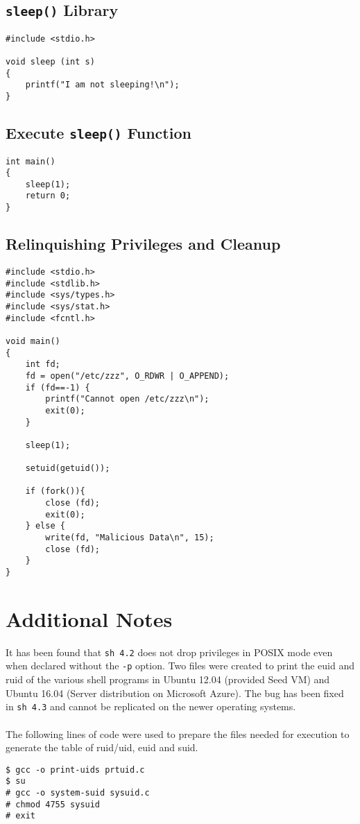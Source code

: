 \documentclass[a4paper,12pt]{article}
\begin{document}
\subsection{\texttt{sleep()} Library}
\label{Appsec:3.7}
\begin{verbatim}
#include <stdio.h>

void sleep (int s)
{
    printf("I am not sleeping!\n");
}
\end{verbatim}
\subsection{Execute \texttt{sleep()} Function}
\begin{verbatim}
int main()
{
    sleep(1);
    return 0;
}
\end{verbatim}
\newpage
\subsection{Relinquishing Privileges and Cleanup}
\label{Appsec:3.72}
\begin{verbatim}
#include <stdio.h>
#include <stdlib.h>
#include <sys/types.h>
#include <sys/stat.h>
#include <fcntl.h>

void main()
{
    int fd;
    fd = open("/etc/zzz", O_RDWR | O_APPEND);
    if (fd==-1) {
        printf("Cannot open /etc/zzz\n");
        exit(0);
    }

    sleep(1);

    setuid(getuid());

    if (fork()){
        close (fd);
        exit(0);
    } else {
        write(fd, "Malicious Data\n", 15);
        close (fd);
    }
}
\end{verbatim}
\newpage
\section{Additional Notes}
It has been found that \texttt{sh 4.2} does not drop privileges in POSIX mode even when declared without the \texttt{-p} option. Two files were created to print the euid and ruid of the various shell programs in Ubuntu 12.04 (provided Seed VM) and Ubuntu 16.04 (Server distribution on Microsoft Azure). The bug has been fixed in \texttt{sh 4.3} and cannot be replicated on the newer operating systems.\\\\
The following lines of code were used to prepare the files needed for execution to generate the table of ruid/uid, euid and suid.
\begin{verbatim}
$ gcc -o print-uids prtuid.c
$ su
# gcc -o system-suid sysuid.c
# chmod 4755 sysuid
# exit
\end{verbatim}
\end{document}
